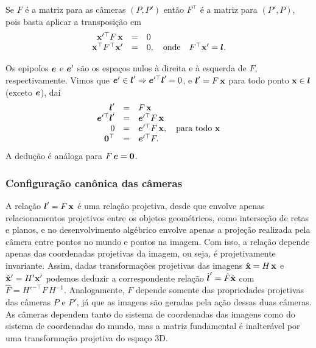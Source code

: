 Se $F$ é a matriz para as câmeras $(P,P')$ então $F^\top$ é a matriz para $(P',P)$, pois basta aplicar a transposição em 
\begin{equation*}
\begin{array}{rcl}
\mathbf{x}'^\top F\,\mathbf{x}&=&0\\
\mathbf{x}^\top F^\top\mathbf{x}'&=&0,\quad\text{onde}\quad F^\top\mathbf{x}'=\boldsymbol{l}.
\end{array}
\end{equation*}

Os epipolos $\boldsymbol{e}$ e $\boldsymbol{e}'$ são os espaços nulos à direita e à esquerda de $F$, respectivamente. Vimos que $\boldsymbol{e}'\in\boldsymbol{l}'\Rightarrow\boldsymbol{e}'^\top\boldsymbol{l}'=0$, e $\boldsymbol{l}'=F\,\mathbf{x}$ para todo ponto $\mathbf{x}\in\boldsymbol{l}$ (exceto $\boldsymbol{e}$), daí
\begin{equation*}
\begin{array}{rcl}
\boldsymbol{l}'&=&F\,\mathbf{x}\\
\boldsymbol{e}'^\top\boldsymbol{l}'&=&\boldsymbol{e}'^\top F\,\mathbf{x}\\
0&=&\boldsymbol{e}'^\top F\,\mathbf{x},\quad\text{para todo}\,\,\mathbf{x}\\
{\bf 0}^\top&=&\boldsymbol{e}'^\top F.
\end{array}
\end{equation*} 
A dedução é análoga para $F\,\boldsymbol{e}={\bf 0}$.

\subsubsection{Configuração canônica das câmeras}\label{sec.cameras-canonicas}
A relação $\boldsymbol{l}'=F\,\mathbf{x}$ é uma relação projetiva, desde que envolve apenas relacionamentos projetivos entre os objetos geométricos, como interseção de retas e planos, e no desenvolvimento algébrico envolve apenas a projeção realizada pela câmera entre pontos no mundo e pontos na imagem. Com isso, a relação depende apenas das coordenadas projetivas da imagem, ou seja, é projetivamente invariante. Assim, dadas transformações projetivas das imagens $\hat{\mathbf{x}}=H\,\mathbf{x}$ e $\hat{\mathbf{x}}'=H'\mathbf{x}'$ podemos deduzir a correspondente relação $\hat{\boldsymbol{l}}'=\hat{F}\hat{\mathbf{x}}$ com $\hat{F}=H'^{-\top}F\,H^{-1}$. Analogamente, $F$ depende somente das propriedades projetivas das câmeras $P$ e $P'$, já que as imagens são geradas pela ação dessas duas câmeras. As câmeras dependem tanto do sistema de coordenadas das imagens como do sistema de coordenadas do mundo, mas a matriz fundamental é inalterável por uma transformação projetiva do espaço 3D. 

